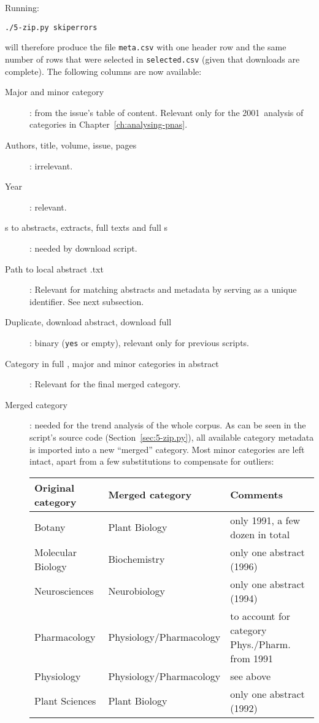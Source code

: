 Running:
\begin{verbatim}
./5-zip.py skiperrors
\end{verbatim}
will therefore produce the file \texttt{meta.csv} with one header row and the same number of rows that were selected in \texttt{selected.csv} (given that downloads are complete). The following columns are now available:
\begin{description}
 \item[Major and minor category]: from the issue's table of content. Relevant only for the 2001~analysis of categories in Chapter~\ref{ch:analysing-pnas}.
 \item[Authors, title, volume, issue, pages]: irrelevant.
 \item[Year]: relevant.
 \item[s to  abstracts, extracts, full texts and full s]: needed by download script.
 \item[Path to local abstract .txt]: Relevant for matching abstracts and metadata by serving as a unique identifier. See next subsection.
 \item[Duplicate, download abstract, download full ]: binary (\texttt{yes} or empty), relevant only for previous scripts.
 \item[Category in full , major and minor categories in abstract]: Relevant for the final merged category.
 \item[Merged category]: needed for the trend analysis of the whole corpus. As can be seen in the script's source code (Section~\ref{sec:5-zip.py}), all available category metadata is imported into a new ``merged'' category. Most minor categories are left intact, apart from a few substitutions to compensate for outliers:
 \begin{center}
\begin{tabular}{ll p{6cm}}\hline
Original category & Merged category & Comments\\\hline
Botany & Plant Biology & only 1991, a few dozen in total\\
Molecular Biology & Biochemistry & only one abstract (1996)\\
Neurosciences & Neurobiology & only one abstract (1994)\\
Pharmacology & Physiology/Pharmacology & to account for category Phys./Pharm. from 1991\\
Physiology & Physiology/Pharmacology & see above\\
Plant Sciences & Plant Biology &only one abstract (1992) \\

\end{tabular}
\end{center}
\end{description}
